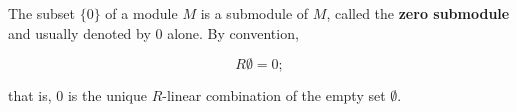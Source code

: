The subset $\{0\}$ of a module $M$ is a submodule of $M$, called the \textbf{zero submodule} and usually denoted by $0$ alone. By convention,

$$R\emptyset = 0;$$

that is, $0$ is the unique $R$-linear combination of the empty set $\emptyset$.
